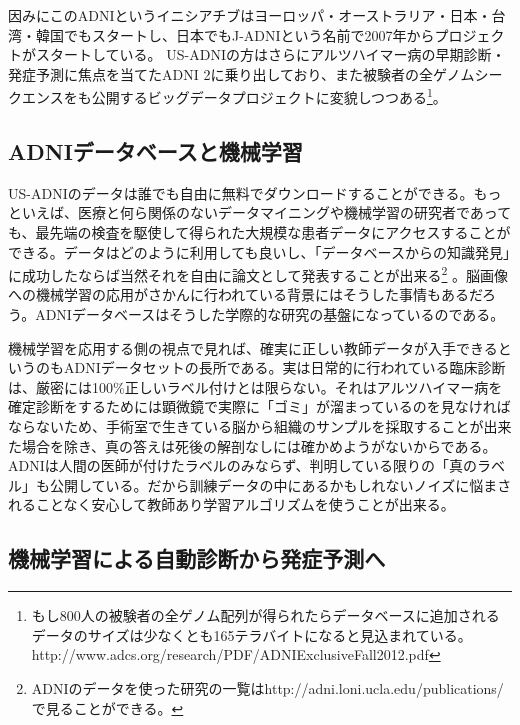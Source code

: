 因みにこのADNIというイニシアチブはヨーロッパ・オーストラリア・日本・台湾・韓国でもスタートし、日本でもJ-ADNIという名前で2007年からプロジェクトがスタートしている。
US-ADNIの方はさらにアルツハイマー病の早期診断・発症予測に焦点を当てたADNI 2に乗り出しており、また被験者の全ゲノムシークエンスをも公開するビッグデータプロジェクトに変貌しつつある\footnote{もし800人の被験者の全ゲノム配列が得られたらデータベースに追加されるデータのサイズは少なくとも165テラバイトになると見込まれている。http://www.adcs.org/research/PDF/ADNIExclusiveFall2012.pdf}。

\subsection{ADNIデータベースと機械学習}
US-ADNIのデータは誰でも自由に無料でダウンロードすることができる。もっといえば、医療と何ら関係のないデータマイニングや機械学習の研究者であっても、最先端の検査を駆使して得られた大規模な患者データにアクセスすることができる。データはどのように利用しても良いし、「データベースからの知識発見」に成功したならば当然それを自由に論文として発表することが出来る\footnote{ADNIのデータを使った研究の一覧はhttp://adni.loni.ucla.edu/publications/で見ることができる。}
。脳画像への機械学習の応用がさかんに行われている背景にはそうした事情もあるだろう。ADNIデータベースはそうした学際的な研究の基盤になっているのである。

機械学習を応用する側の視点で見れば、確実に正しい教師データが入手できるというのもADNIデータセットの長所である。実は日常的に行われている臨床診断は、厳密には100\%正しいラベル付けとは限らない。それはアルツハイマー病を確定診断をするためには顕微鏡で実際に「ゴミ」が溜まっているのを見なければならないため、手術室で生きている脳から組織のサンプルを採取することが出来た場合を除き、真の答えは死後の解剖なしには確かめようがないからである。ADNIは人間の医師が付けたラベルのみならず、判明している限りの「真のラベル」も公開している。だから訓練データの中にあるかもしれないノイズに悩まされることなく安心して教師あり学習アルゴリズムを使うことが出来る。
\subsection{機械学習による自動診断から発症予測へ}

